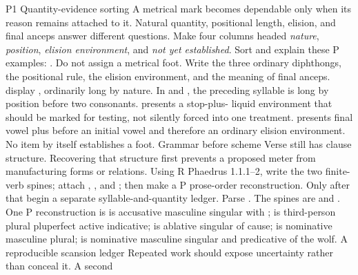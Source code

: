 
\begin{courseunit}{P1}
\SubmoduleExtension
  {Quantity-evidence sorting}
  {A metrical mark becomes dependable only when its reason remains attached
  to it. Natural quantity, positional length, elision, and final anceps answer
  different questions.}
  {Make four columns headed \emph{nature}, \emph{position}, \emph{elision
  environment}, and \emph{not yet established}. Sort and explain these P
  examples: . Do not assign a metrical foot.}
  {Write the three ordinary diphthongs, the positional rule, the elision
  environment, and the meaning of final anceps.}
  { display , ordinarily long
  by nature. In  and , the preceding syllable is
  long by position before two consonants.  presents a stop-plus-
  liquid environment that should be marked for testing, not silently forced
  into one treatment.  presents final vowel plus
   before an initial vowel and therefore an ordinary elision
  environment. No item by itself establishes a foot.}
\SubmoduleExtension
  {Grammar before scheme}
  {Verse still has clause structure. Recovering that structure first prevents
  a proposed meter from manufacturing forms or relations.}
  {Using R Phaedrus 1.1.1--2, write the two finite-verb spines; attach
  , , and ; then
  make a P prose-order reconstruction. Only after that begin a separate
  syllable-and-quantity ledger.}
  {Parse .}
  {The spines are  and .
  One P reconstruction is   is accusative
  masculine singular with ;  is third-person
  plural pluperfect active indicative;  is ablative singular of
  cause;  is nominative masculine plural;  is
  nominative masculine singular and predicative of the wolf.}
\SubmoduleExtension
  {A reproducible scansion ledger}
  {Repeated work should expose uncertainty rather than conceal it. A second
}
\end{courseunit}
